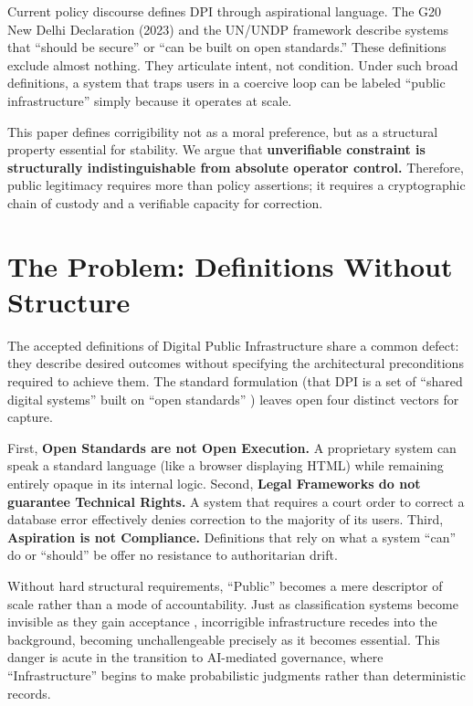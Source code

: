 \documentclass{article}
\begin{document}
Current policy discourse defines DPI through aspirational language. The G20 New Delhi Declaration (2023) and the UN/UNDP framework \citep{undp} describe systems that ``should be secure'' or ``can be built on open standards.'' These definitions exclude almost nothing. They articulate intent, not condition. Under such broad definitions, a system that traps users in a coercive loop can be labeled ``public infrastructure'' simply because it operates at scale.

This paper defines corrigibility not as a moral preference, but as a structural property essential for stability. We argue that \textbf{unverifiable constraint is structurally indistinguishable from absolute operator control.} Therefore, public legitimacy requires more than policy assertions; it requires a cryptographic chain of custody and a verifiable capacity for correction.

\section{The Problem: Definitions Without Structure}

The accepted definitions of Digital Public Infrastructure share a common defect: they describe desired outcomes without specifying the architectural preconditions required to achieve them. The standard formulation (that DPI is a set of ``shared digital systems'' built on ``open standards'' \citep{g20}) leaves open four distinct vectors for capture.

First, \textbf{Open Standards are not Open Execution.} A proprietary system can speak a standard language (like a browser displaying HTML) while remaining entirely opaque in its internal logic.
Second, \textbf{Legal Frameworks do not guarantee Technical Rights.} A system that requires a court order to correct a database error effectively denies correction to the majority of its users.
Third, \textbf{Aspiration is not Compliance.} Definitions that rely on what a system ``can'' do or ``should'' be offer no resistance to authoritarian drift.

Without hard structural requirements, ``Public'' becomes a mere descriptor of scale rather than a mode of accountability. Just as classification systems become invisible as they gain acceptance \citep{bowker1999}, incorrigible infrastructure recedes into the background, becoming unchallengeable precisely as it becomes essential. This danger is acute in the transition to AI-mediated governance, where ``Infrastructure'' begins to make probabilistic judgments rather than deterministic records.
\end{document}
